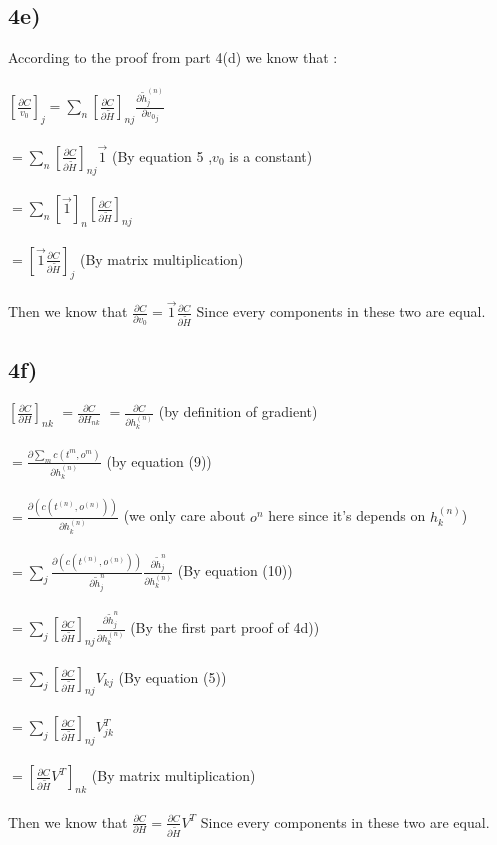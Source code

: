 \documentclass{article}  %
\begin{document}
		 \subsection{4e)}
		According to the proof from part 4(d) we know that :\\\\
		$[\frac{\partial C}{ v_{0}}]_{j} =  \sum_{n}[\frac{\partial C}{\partial \tilde{H}}]_{nj}\frac{\partial \tilde{h}_{j}^{(n)}}{\partial {v_{0}}_{j}} $\\\\
		$ = \sum_{n}[\frac{\partial C}{\partial \tilde{H}}]_{nj} \vec{1}$ (By equation 5 ,$v_{0}$ is a constant)\\\\
		$ = \sum_{n}[\vec{1}]_{n}[\frac{\partial C}{\partial \tilde{H}}]_{nj}$\\\\
		$ = [\vec{1}\frac{\partial C}{\partial \tilde{H}}]_{j}$ (By matrix multiplication)\\\\
		Then we know that $\frac{\partial C}{\partial v_{0}} = \vec{1} \frac{\partial C}{\partial \tilde{H}}$ Since every components in these two are equal.
		 \subsection{4f)}
		 $[\frac{\partial C}{\partial H}]_{nk} $ 
		 $= \frac{\partial C}{\partial H_{nk}}$ 
		 $= \frac{\partial C}{\partial h^{(n)}_{k}}$ (by definition of gradient)\\\\
		 $= \frac{\partial \sum_{m} c(t^{m},o^{m})}{\partial h^{(n)}_{k}}$ (by equation (9))\\\\
		 $=\frac{\partial(c(t^{(n)},o^{(n)}))}{\partial h^{(n)}_{k}}$ (we only care about $o^n$ here since it's depends on $h^{(n)}_{k}$)\\\\
		 $ = \sum_{j} \frac{\partial(c(t^{(n)},o^{(n)}))}{\partial \tilde{h}_{j}^{n}}\frac{\partial \tilde{h}_{j}^{n}}{\partial h^{(n)}_{k}}$ (By equation (10))\\\\
		 $ = \sum_{j} [\frac{\partial C}{\partial \tilde{H}}]_{nj} \frac{\partial \tilde{h}_{j}^{n}}{\partial h^{(n)}_{k}} $ (By the first part proof of 4d))\\\\
		 $=\sum_{j} [\frac{\partial C}{\partial \tilde{H}}]_{nj} V_{kj}$ (By equation (5))\\\\
		 $= \sum_{j} [\frac{\partial C}{\partial \tilde{H}}]_{nj} V^{T}_{jk}$\\\\
		 $= [\frac{\partial C}{\partial \tilde{H}}V^{T}]_{nk}$ (By matrix multiplication)\\\\
		 Then we know that $\frac{\partial C}{\partial H} = \frac{\partial C}{\partial \tilde{H}} V^{T}$ Since every components in these two are equal.
\end{document}
